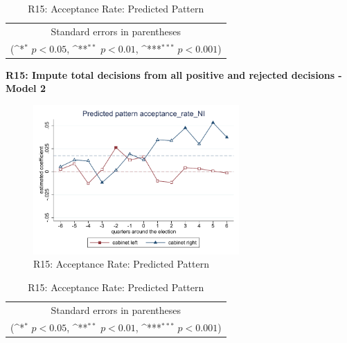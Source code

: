 \documentclass[10pt,a4paper]{scrartcl}
\begin{document}
\begin{table}[!ht]\centering
	\renewcommand{\arraystretch}{1.25}
	\def\sym#1{\ifmmode^{#1}\else\(^{#1}\)\fi}
	\caption{R15: Acceptance Rate: Predicted Pattern}
	\begin{tabular}{l*{2}{c}}
		\hline\hline
		
		\hline\hline
		\multicolumn{3}{c}{\footnotesize Standard errors in parentheses} \\
		\multicolumn{3}{c}{\footnotesize (\sym{*} \(p<0.05\), \sym{**} \(p<0.01\), \sym{***} \(p<0.001\))}\\
	\end{tabular}
\end{table}

\clearpage
\textbf{R15: Impute total decisions from all positive and rejected decisions - Model 2}
\begin{figure}[!ht]
	\centering
	\includegraphics[width=0.7\textwidth]{figures_edited/acceptance_rate_NI_graph2_R15.pdf}
	\caption{R15: Acceptance Rate: Predicted Pattern}
\end{figure}

\begin{table}[!ht]\centering
	\footnotesize
	\renewcommand{\arraystretch}{1.2}
	\def\sym#1{\ifmmode^{#1}\else\(^{#1}\)\fi}
	\caption{R15: Acceptance Rate: Predicted Pattern}
	\begin{tabular}{l*{2}{c}}
		\hline\hline
		
		\hline\hline
		\multicolumn{3}{c}{\footnotesize Standard errors in parentheses} \\
		\multicolumn{3}{c}{\footnotesize (\sym{*} \(p<0.05\), \sym{**} \(p<0.01\), \sym{***} \(p<0.001\))} \\
	\end{tabular}
\end{table}
\end{document}
